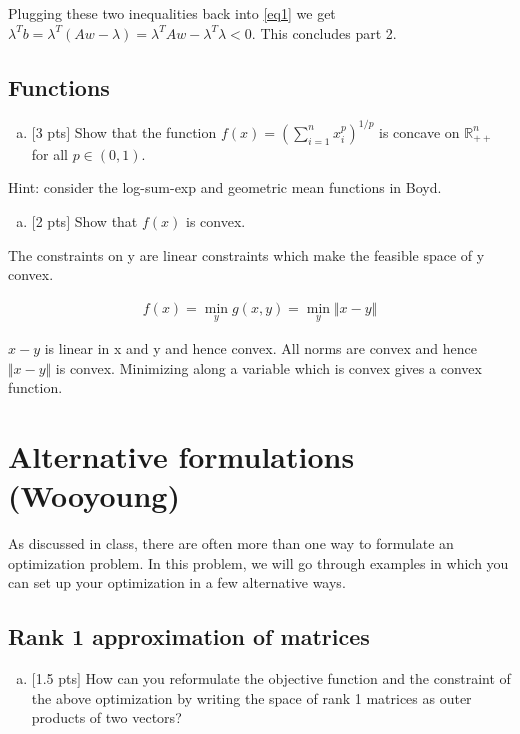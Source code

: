 \documentclass[12pt]{article}
\begin{document}
Plugging these two inequalities back into \ref{eq1} we get $\lambda^Tb = \lambda^T(Aw-\lambda) = \lambda^TAw - \lambda^T\lambda < 0$. This concludes part 2. 


\subsection{Functions}

\begin{enumerate}[(a)]
\item
$[$3 pts$]$  Show that the function $f(x) = \left( \sum_{i=1}^n x_i^p\right)^{1/p}$ is concave on $\mathbb{R}^n_{++}$ for all $p\in(0,1)$.
\end{enumerate}
Hint: consider the log-sum-exp and geometric mean functions in Boyd.

\vspace{.5cm}

\begin{enumerate}[(b)]
\item
$[$2 pts$]$  Show that $f(x)$ is convex.
\end{enumerate}

The constraints on y are linear constraints which make the feasible space of y convex. 

\begin{align*}
f(x) = \min_y g(x,y) = \min_y \Vert x - y \Vert 
\end{align*}

$x-y$ is linear in x and y and hence convex. All norms are convex and hence $\Vert x - y \Vert$ is convex. Minimizing along a variable which is convex gives a convex function. 
\newpage
\clearpage


\section{ Alternative formulations (Wooyoung)}

As discussed in class, there are often more than one way to formulate an optimization problem. In this problem, we will go through examples in which you can set up your optimization in a few alternative ways.

\subsection{Rank 1 approximation of matrices }
 
\begin{enumerate}[(a)]
\item 
$[$1.5 pts$]$ How can you reformulate the objective function and the constraint of the above optimization by writing the space of rank 1 matrices as outer products of two vectors?
\end{enumerate}
\vspace{.25cm}
\end{document}
